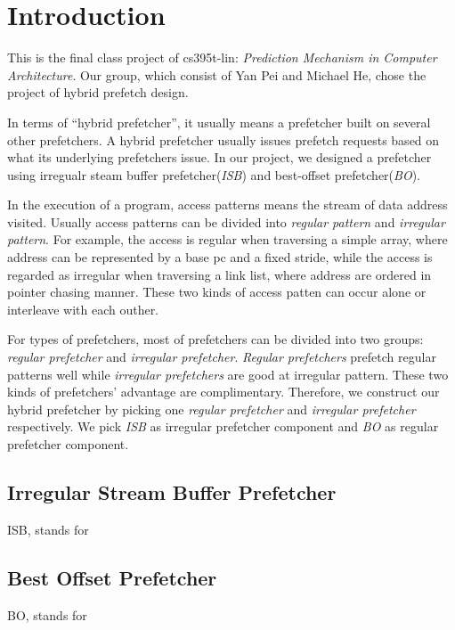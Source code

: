 \section{Introduction}
\label{sec:intro}

This is the final class project of cs395t-lin: \emph{Prediction Mechanism in Computer Architecture}. Our group, which consist of Yan Pei and Michael He, chose the project of hybrid prefetch design.

In terms of ``hybrid prefetcher'', it usually means a prefetcher built on several other prefetchers. A hybrid prefetcher usually issues prefetch requests based on what its underlying prefetchers issue. In our project, we designed a prefetcher using irregualr steam buffer prefetcher(\emph{ISB})\cite{isbpaper} and best-offset prefetcher(\emph{BO})\cite{bopaper}.

In the execution of a program, access patterns means the stream of data address visited. Usually access patterns can be divided into \emph{regular pattern} and \emph{irregular pattern}. For example, the access is regular when traversing a simple array, where address can be represented by a base pc and a fixed stride, while the access is regarded as irregular when traversing a link list, where address are ordered in pointer chasing manner. These two kinds of access patten can occur alone or interleave with each outher.

For types of prefetchers, most of prefetchers can be divided into two groups: \emph{regular prefetcher}\cite{bopaper, sandboxpaper} and \emph{irregular prefetcher}\cite{isbpaper, ghbpaper, reinforcementlearning}. \emph{Regular prefetchers} prefetch regular patterns well while \emph{irregular prefetchers} are good at irregular pattern. These two kinds of prefetchers' advantage are complimentary. Therefore, we construct our hybrid prefetcher by picking one \emph{regular prefetcher} and \emph{irregular prefetcher} respectively. We pick \emph{ISB}\cite{isbpaper} as irregular prefetcher component and \emph{BO}\cite{bopaper} as regular prefetcher component.

  \subsection{Irregular Stream Buffer Prefetcher}
  \label{sec:isbintro}

  ISB, stands for

  \subsection{Best Offset Prefetcher}
  \label{sec:bointro}
  BO, stands for
